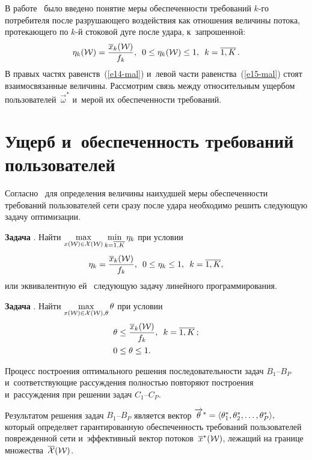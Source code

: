 \begin{multicols}{2}
В работе~\cite{Mal99} было введено понятие меры обеспеченности требований $k$-го 
потребителя после разрушающего воздействия как отношения величины потока, 
протекающего по $k$-й стоковой дуге после удара, к~запрошенной:
\begin{equation}
 \eta_k({\cal W}) = \displaystyle\frac{\displaystyle \overline x_k({\cal W})\mathstrut}{\displaystyle f_k\mathstrut}, \enskip 0 \le \eta_k({\cal W}) \le 1, \enskip 
 k = \overline{1, K}\,.  
 \label{e15-mal}
 \end{equation}
В правых частях равенств~(\ref{e14-mal}) и~левой части равенства~(\ref{e15-mal}) 
стоят взаимосвязанные величины. Рас\-смот\-рим связь между относительным ущербом 
пользователей~$\overrightarrow{\omega}^*$ и~мерой их обеспеченности требований. 

\section{Ущерб и~обеспеченность требований пользователей}

Согласно~\cite{Mal99} для определения величины наихудшей меры обеспеченности 
требований пользователей сети сразу после удара необходимо решить следующую 
задачу оптимизации.

\smallskip

\noindent
\textbf{Задача}  {}. Найти
$\max\limits_{x({\cal W}) \in {\cal X}({\cal W})} \min\limits_{k = \overline{1, K}} \eta_{k}$
при условии
$$
\eta_{k} = \displaystyle\frac{\displaystyle \overline x_{k}({\cal W})\mathstrut}{\displaystyle f_{k}\mathstrut}, \enskip
 0 \le \eta_k \le 1, \enskip k = \overline{1, K},  
 $$
или эквивалентную ей~\cite{Dan} следующую задачу линейного программирования.

\smallskip

\noindent
\textbf{Задача} {}.   Найти
$ \max\limits_{x({\cal W}) \in {\cal X}({\cal W}), \theta} \theta$
при условии
\begin{align*}
& \displaystyle \theta \le \displaystyle\frac{\displaystyle \overline x_{k}({\cal W})\mathstrut}{\displaystyle f_{k}\mathstrut}, \enskip 
 k = \overline{1, K}\,;\\
&0 \le \theta \le 1. 
                    \end{align*}


Процесс построения оптимального решения последовательности задач $B_1$--$B_P$  
и~соответ\-ст\-ву\-ющие рассуждения полностью повторяют по\-стро\-ения и~рассуждения 
при решении задач $C_1$--$C_P$.

Результатом решения задач $B_1$--$B_{P}$ является вектор
$ \overrightarrow{\theta}^* \hm= \langle \theta^*_1, \theta^*_2, \ldots, 
\theta^*_P \rangle, $
который определяет гарантированную обеспеченность требований пользователей 
поврежденной сети и~эффективный вектор потоков~$\overline x^*({\cal W})$, лежащий на границе 
множества~$\overline{{\cal X}}({\cal W})$.


\end{multicols}
